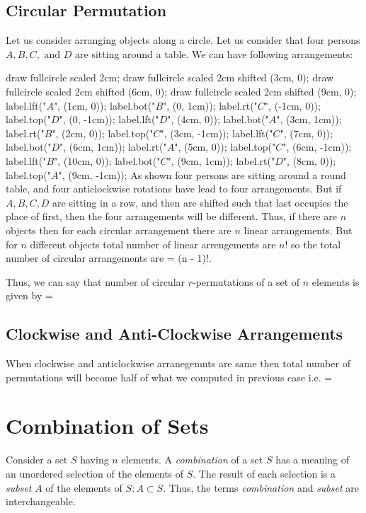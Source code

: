 \subsection{Circular Permutation}
Let us consider arranging objects along a circle. Let us consider that four persons $A, B, C,$ and $D$ are sitting around a table. We
can have following arrangements:

\startplacefigure[location=force]
  \startMPcode
    draw fullcircle scaled 2cm;
    draw fullcircle scaled 2cm shifted (3cm, 0);
    draw fullcircle scaled 2cm shifted (6cm, 0);
    draw fullcircle scaled 2cm shifted (9cm, 0);
    label.lft("$A$", (1cm, 0));
    label.bot("$B$", (0, 1cm));
    label.rt("$C$", (-1cm, 0));
    label.top("$D$", (0, -1cm));
    label.lft("$D$", (4cm, 0));
    label.bot("$A$", (3cm, 1cm));
    label.rt("$B$", (2cm, 0));
    label.top("$C$", (3cm, -1cm));
    label.lft("$C$", (7cm, 0));
    label.bot("$D$", (6cm, 1cm));
    label.rt("$A$", (5cm, 0));
    label.top("$C$", (6cm, -1cm));
    label.lft("$B$", (10cm, 0));
    label.bot("$C$", (9cm, 1cm));
    label.rt("$D$", (8cm, 0));
    label.top("$A$", (9cm, -1cm));
  \stopMPcode
\stopplacefigure
As shown four persons are sitting around a round table, and four anticlockwise rotations have lead to four arrangements. But if
$A,B,C,D$ are sitting in a row, and then are shifted such that last occupies the place of first, then the four arrangements will be
different. Thus, if there are $n$ objects then for each circular arrangement there are $n$ linear arrangements. But for $n$ different
objects total number of linear arrengements are $n!$ so the total number of circular arrangements are \startformula {} = (n - 1)!.\stopformula

Thus, we can say that number of circular $r$-permutations of a set of $n$ elements is given by \startformula {} = \stopformula

\subsection{Clockwise and Anti-Clockwise Arrangements}
When clockwise and anticlockwise arranegemnts are same then total number of permutations will become half of what we computed in
previous case i.e. \startformula {} = \stopformula

\section{Combination of Sets}
Consider a set $S$ having $n$ elements. A {\it combination} of a set $S$ has a meaning of an unordered selection of the elements
of $S$. The result of each selection is a {\it subset} $A$ of the elements of $S: A\subset S$. Thus, the terms
{\it combination} and {\it subset} are interchangeable.

